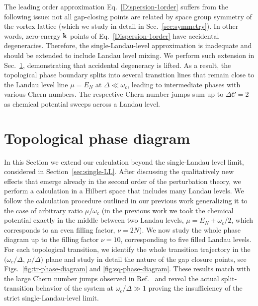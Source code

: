 \documentclass[10pt,prb,aps,superscriptaddress,amsmath,amssymb,twocolumn,floatfix,longbibliography]{revtex4-1}
\newcommand{\bk}{{\bf k}}
\begin{document}
The leading order approximation Eq.~\eqref{Dispersion-1order} suffers from the following issue: not all gap-closing points are related by space group symmetry of the vortex lattice (which we study in detail in Sec.~\ref{sec:symmetry}). In other words, zero-energy $\bk$ points of Eq.~\eqref{Dispersion-1order} have accidental degeneracies. Therefore, the single-Landau-level approximation is inadequate and should be  extended to include Landau level mixing. We perform such extension in Sec.~\ref{sec:many-LLs}, demonstrating that accidental degeneracy is lifted. 
As a result, the topological phase boundary splits into several transition lines that remain close to the Landau level line $\mu = E_N$ at $\Delta \ll \omega_c$, leading to intermediate phases with various Chern numbers. The respective Chern number jumps sum up to $\Delta \mathcal{C} = 2$ as chemical potential sweeps across a Landau level.

\section{Topological phase diagram}
\label{sec:many-LLs}
In this Section we extend our calculation beyond the single-Landau level limit, considered in Section~\ref{sec:single-LL}. After discussing the qualitatively new effects that emerge already in the second order of the perturbation theory, we perform a calculation in a Hilbert space 
that includes many Landau levels.
We follow the calculation procedure outlined in our previous work\cite{MakingSwaveTopological} generalizing it to the case of arbitrary ratio $\mu / \omega_c$ (in the previous work we took the chemical potential exactly in the middle between two Landau levels, $\mu = E_N + \omega_c / 2$, which corresponds to an even filling factor, $\nu = 2N$). We now study the whole phase diagram up to the filling factor $\nu = 10$, corresponding to five filled Landau levels. For each  topological transition, we identify the whole transition trajectory in the $(\omega_c / \Delta$, $\mu / \Delta)$ plane and study in detail the nature of the gap closure points, see Figs.~\ref{fig:tr-phase-diagram} and \ref{fig:sq-phase-diagram}. These results match with the large Chern number jumps observed in Ref.~  and reveal the actual split-transition behavior of the system at $\omega_c / \Delta \gg 1$ proving the insufficiency of the strict single-Landau-level limit.
\end{document}
